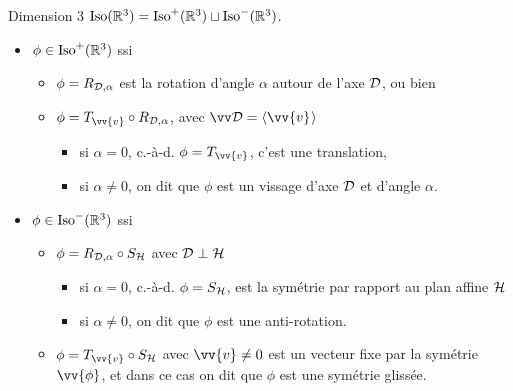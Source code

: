 \documentclass{m53beamer}
\begin{document}
\begin{frame}{Dimension 3}
    $\operatorname{Iso}(\mathbb{R}^{3}) = \operatorname{Iso}^{+}(\mathbb{R}^{3}) \sqcup \operatorname{Iso}^{-}(\mathbb{R}^{3})$.
      \begin{itemize}[<+(1)->]
        \item $\phi\in\operatorname{Iso}^{+}(\mathbb{R}^{3})$ ssi
          \begin{itemize}[<+(1)->]
            \item $\phi = R_{\mathcal{D},\alpha}$ est la rotation d'angle $\alpha$ autour de l'axe $\mathcal{D}$, ou bien
            \item $\phi = T_{\vv{v}}\circ R_{\ens{D},\alpha}$, avec $\ev{D}=\affspan{\vv{v}}$
            \begin{itemize}[<+(1)->]
              \item si $\alpha=0$, c.-à-d. $\phi = T_{\vv{v}}$, c'est une translation,
              \item si $\alpha\neq 0$, on dit que $\phi$ est un \alert{vissage} d'axe $\mathcal{D}$ et d'angle $\alpha$.
            \end{itemize}
          \end{itemize}
        \item $\phi\in\operatorname{Iso}^{-}(\mathbb{R}^{3})$ ssi
          \begin{itemize}[<+(1)->]
            \item $\phi = R_{\mathcal{D},\alpha}\circ S_{\mathcal{H}}$ avec $\mathcal{D}\perp\mathcal{H}$
            \begin{itemize}[<+(1)->]
              \item si $\alpha=0$, c.-à-d. $\phi = S_{\mathcal{H}}$, est la symétrie par rapport au plan affine $\mathcal{H}$
              \item si $\alpha\neq 0$, on dit que $\phi$ est une \alert{anti-rotation}.
            \end{itemize}
            \item $\phi = T_{\vv{v}}\circ S_{\ens{H}}$ avec $\vv{v}\neq0$ est un vecteur fixe par la symétrie $\vv{\phi}$\pause, et dans ce cas on dit que $\phi$ est une \alert{symétrie glissée}.
          \end{itemize}
      \end{itemize}\pause
\end{frame}

\end{document}
